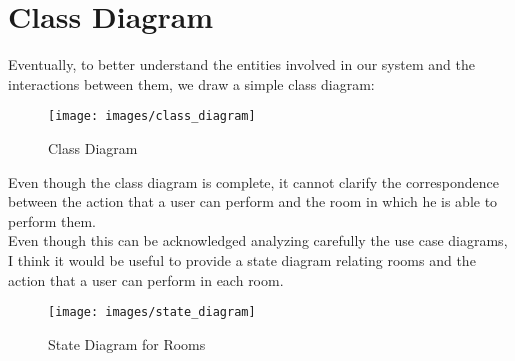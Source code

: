 	\section{Class Diagram}
	Eventually, to better understand the entities involved in our system and the interactions between them, we draw a simple class diagram:
	\begin{figure}[H]
		\centering
		\texttt{[image: images/class\_diagram]}
		\caption{Class Diagram}
		\label{fig:class_diagram}
	\end{figure}
\newpage
	Even though the class diagram is complete, it cannot clarify the correspondence between the action that a user can perform and the room in which he is able to perform them.\\
	Even though this can be acknowledged analyzing carefully the use case diagrams, I think it would be useful to provide a state diagram relating rooms and the action that a user can perform in each room.
	\begin{figure}[H]
		\centering
		\texttt{[image: images/state\_diagram]}
		\caption{State Diagram for Rooms}
		\label{fig:state_diagram}
	\end{figure}